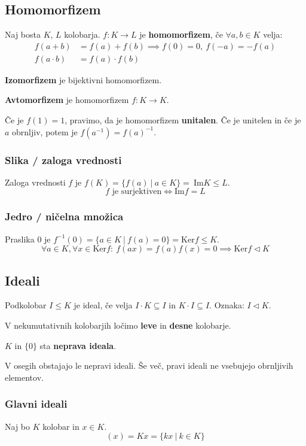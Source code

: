 	\subsection*{Homomorfizem}
	Naj bosta $K$, $L$ kolobarja. $f:K \to L$ je \textbf{homomorfizem}, če $\forall a, b \in K$ velja:
	\begin{align*}
		f(a+b) &= f(a) + f(b) \implies f(0) = 0,\ f(-a) = -f(a)\\
		f(a \cdot b) &= f(a) \cdot f(b)
	\end{align*}

	\textbf{Izomorfizem} je bijektivni homomorfizem.

	\textbf{Avtomorfizem} je homomorfizem $f: K \to K$.

	Če je $f(1) = 1$, pravimo, da je homomorfizem \textbf{unitalen}. Če je unitelen in če je $a$ obrnljiv, potem je $f(a^{-1}) = f(a)^{-1}$.

	\subsubsection*{Slika / zaloga vrednosti}
	Zaloga vrednosti $f$ je $f(K) = \{ f(a)\ |\ a \in K\} = \ \text{Im}K \leq L$.
	\[ f \text{ je surjektiven} \iff \text{Im}f = L\]
	
	\subsubsection*{Jedro / ničelna množica}
	Praslika 0 je $f^{-1}(0) = \{ a \in K \ |\ f(a) = 0\} = \text{Ker}f \leq K$.
	\[ \forall a \in K, \forall x \in \text{Ker} f:\ f(ax) = f(a)f(x) = 0 \implies \text{Ker}f \lhd K\]

	\subsection*{Ideali}
	Podkolobar $I \leq K$ je ideal, če velja $I\cdot K \subseteq I$ in $K\cdot I \subseteq I$. Oznaka: $I \lhd K$.

	V nekumutativnih kolobarjih ločimo \textbf{leve} in \textbf{desne} kolobarje.

	$K$ in $\{0\}$ sta \textbf{neprava ideala}.

	V osegih obstajajo le nepravi ideali. Še več, pravi ideali ne vsebujejo obrnljivih elementov.

	\subsubsection*{Glavni ideali}
	Naj bo $K$ kolobar in $x \in K$.
	\[ (x) = Kx = \{kx\ |\ k \in K\}\]

